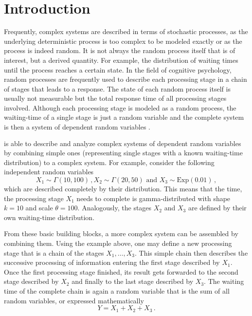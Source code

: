  \section{Introduction} \label{sec:intro}
Frequently, complex systems are described in terms of stochastic processes, as the
underlying deterministic process is too complex to be modeled exactly or as the
process is indeed random. It is not always the random process itself that is of 
interest, but a derived quantity. For example, the distribution of waiting times until the
process reaches a certain state. In the field of cognitive psychology, random processes are frequently used to
describe each processing stage in a chain of stages that leads to a response. The state of
each random process itself is usually not measurable but the total response time of all processing 
stages involved. Although each processing stage is modeled as a random process, the waiting-time
of a single stage is just a random variable and the complete system is then a system of dependent random 
variables \cite[e.g.,][]{Reichle2003}.

 is able to describe and analyze complex systems of dependent random variables
by combining simple ones (representing single stages with a known waiting-time distribution) to
a complex system. For example, consider the following independent random variables
\begin{equation}
  X_1 \sim \Gamma(10, 100)\,, X_2 \sim \Gamma(20, 50)\text{ and } X_3 \sim \text{Exp}(0.01)\,,\nonumber
\end{equation}
which are described completely by their distribution. This means that the time, the
processing stage $X_1$ needs to complete is gamma-distributed with shape $k=10$ and scale
$\theta=100$. Analogously, the stages $X_2$ and $X_3$ are defined by their own waiting-time 
distribution.

From these basic building blocks, a more complex system can be assembled by
combining them. Using the example above, one may define a new processing stage that is a chain of
the stages $X_1,\dots,X_3$. This simple chain then describes the successive
processing of information entering the first stage described by $X_1$.
Once the first processing stage finished, its result gets forwarded to the second stage described
by $X_2$ and finally to the last stage described by $X_3$. The waiting time of the
complete chain is again a random variable that is the sum of all random variables,
or expressed mathematically
\begin{equation}
 Y = X_1 + X_2 + X_3\,. \nonumber
\end{equation}

